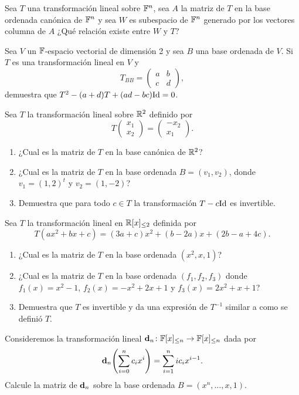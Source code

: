 \begin{exerciselist}
  \item Sea $T$ una transformación lineal sobre $\mathbb{F}^n$, sea $A$ la matriz de $T$ en la base ordenada canónica de $\mathbb{F}^n$ y sea $W$ es subespacio de $\mathbb{F}^n$ generado por los vectores columna de $A$ ¿Qué relación existe entre $W$ y $T$?
  
  \item Sea $V$ un $\mathbb{F}$-espacio vectorial de dimensión 2 y sea $B$ una base ordenada de $V$. Si $T$ es una transformación lineal en $V$ y 
    \[ T_{BB} = \begin{pmatrix}
      a & b \\ c & d
    \end{pmatrix}, \]
    demuestra que $T^2 - (a+d)T + (ad-bc)\mathrm{Id} = 0$.

  \item Sea $T$ la transformación lineal sobre $\mathbb{R}^2$ definido por
    \[ T\begin{pmatrix} x_1 \\ x_2 \end{pmatrix} = \begin{pmatrix} -x_2 \\ x_1 \end{pmatrix}. \]
    \begin{enumerate}
      \item ¿Cual es la matriz de $T$ en la base canónica de $\mathbb{R}^2$?
      \item ¿Cual es la matriz de $T$ en la base ordenada $B = (v_1, v_2)$, donde $v_1 = (1,2)^t$ y $v_2 = (1, -2)$?
      \item Demuestra que para todo $c \in T$ la transformación $T - c\mathrm{Id}$ es invertible.
    \end{enumerate}
    
  \item Sea $T$ la transformación lineal en $\mathbb{R}[x]_{\leq 2}$ definida por
    \[ T(ax^2+bx+c) = (3a+c)x^2 + (b-2a)x + (2b-a+4c). \]
    \begin{enumerate}
      \item ¿Cual es la matriz de $T$ en la base ordenada $(x^2, x, 1)$?
      \item ¿Cual es la matriz de $T$ en la base ordenada $(f_1, f_2, f_3)$ donde $f_1(x) = x^2-1$, $f_2(x) = -x^2+2x+1$ y $f_3(x) = 2x^2 +x +1$?
      \item Demuestra que $T$ es invertible y da una expresión de $T^{-1}$ similar a como se definió $T$.
    \end{enumerate}

  \item Consideremos la transformación lineal $\mathbf{d}_n \colon \mathbb{F}[x]_{\leq n} \to \mathbb{F}[x]_{\leq n}$ dada por
    \[ \bec d_n \paren{\sum_{i=0}^n c_ix^i} = \sum_{i=1}^n ic_ix^{i-1}. \]
    Calcule la matriz de $\mathbf{d}_n$ sobre la base ordenada $B = (x^n, \ldots, x, 1)$.
\end{exerciselist}